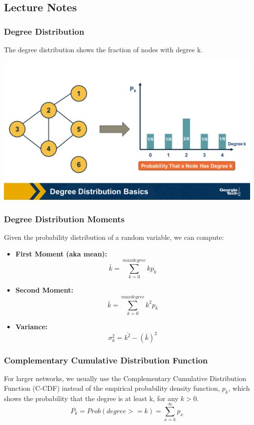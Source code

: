 \documentclass[11pt]{scrartcl} %
\begin{document}
\subsection{Lecture Notes}

\subsubsection{Degree Distribution}
The degree distribution shows the fraction of nodes with degree k.
	\begin{center}
		\includegraphics[width=0.75\linewidth]{img/L3.1-DegreeDistro.png}
	\end{center}

\subsubsection{Degree Distribution Moments}
Given the probability distribution of a random variable, we can compute:
\begin{itemize}
	\item \textbf{First Moment (aka mean):} 
			\[ \bar{k} = \sum_{k=0}^{maxdegree} k p_k \]
	\item \textbf{Second Moment:} 
			\[ \bar{k} = \sum_{k=0}^{maxdegree} k^2 p_k \]
	\item \textbf{Variance:} 
			\[ \sigma_{k}^{2} = \overline{k^2} - (\bar{k})^2 \]
\end{itemize}

\subsubsection{Complementary Cumulative Distribution Function}
For larger networks, we usually use the Complementary Cumulative Distribution Function (C-CDF) instead of the empirical probability density function, $p_k$, which shows the probability that the degree is at least k, for any $k>0$.
\[ \overline{P_k} = Prob(degree >= k) = \sum_{x=k}^{\infty} p_x \]
\end{document}
